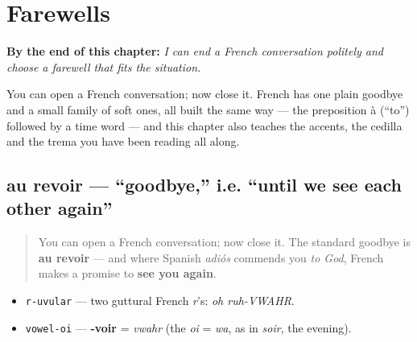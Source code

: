 
\chapter{Farewells}
\label{ch:farewells}

\begin{chapteropening}
\textbf{By the end of this chapter:} \emph{I can end a French conversation politely and choose a farewell that fits the situation.}

You can open a French conversation; now close it. French has one plain goodbye and a small family of soft ones, all built the same way — the preposition à (“to”) followed by a time word — and this chapter also teaches the accents, the cedilla and the trema you have been reading all along.
\end{chapteropening}

\section[au revoir]{au revoir — \textquotedblleft{}goodbye,\textquotedblright{} i.e. \textquotedblleft{}until we see each other again\textquotedblright{}}

\label{lesson:FR-C04-au-revoir}



\begin{quote}
You can open a French conversation; now close it. The standard goodbye is \textbf{au revoir} — and where Spanish \emph{adiós} commends you \emph{to God}, French makes a promise to \textbf{see you again}.
\end{quote}

\begin{sounds}
\begin{itemize}
\raggedright
  \item \texttt{r-uvular} — two guttural French \emph{r}'s: \emph{oh ruh-VWAHR}.
  \item \texttt{vowel-oi} — \textbf{-voir} = \emph{vwahr} (the \emph{oi} = \emph{wa}, as in \emph{soir}, the evening).
\end{itemize}
\end{sounds}

